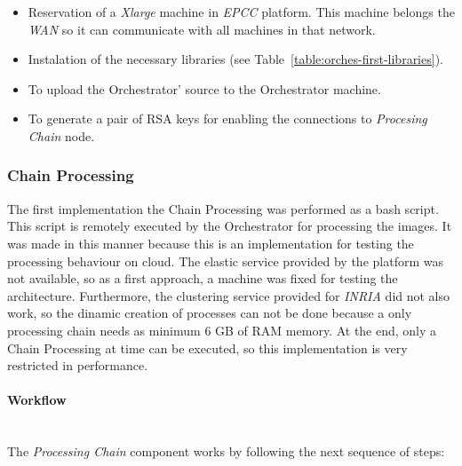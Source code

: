 \begin{itemize}
 \item Reservation of a \emph{Xlarge} machine in \emph{EPCC} \bonfire
   platform. This machine belongs the \bonfire \emph{WAN} so it can communicate
   with all machines in that network. 
 \item Instalation of the necessary libraries (see
   Table~\ref{table:orches-first-libraries}).
 \item To upload the Orchestrator' source to the Orchestrator machine.
 \item To generate a pair of \ac{RSA} keys for enabling the connections to
   \emph{Procesing Chain} node.
\end{itemize}

\subsubsection{Chain Processing}

The first implementation the Chain Processing was performed as a bash
script. This script is remotely executed by the Orchestrator for processing the
images. It was made in this manner because this is an implementation for testing the
processing behaviour on cloud. The elastic service provided by the \bonfire
platform was not available, so as a first approach, a machine was fixed for
testing the architecture. Furthermore, the clustering service provided for
\emph{INRIA} did not also work, so the dinamic creation of processes can not be
done because a only processing chain needs as minimum 6 GB of RAM memory. At the
end, only a Chain Processing at time can be executed, so this implementation is
very restricted in performance. 

\paragraph{Workflow}~\\

The \emph{Processing Chain} component works by following the next sequence of
steps:

